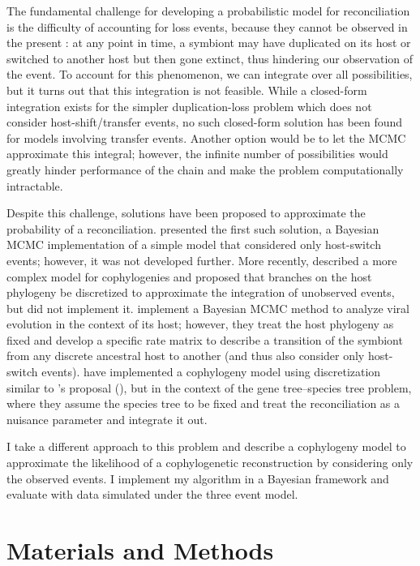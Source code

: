 \documentclass[12pt,letterpaper]{article}
\newcommand{\aposcite}[2]{\citeauthor{#1}'s #2 (\citeyear{#1})}
\begin{document}
The fundamental challenge for developing a probabilistic model for reconciliation is the difficulty of accounting for loss events, because they cannot be observed in the present \parencite{Charleston:2009}: at any point in time, a symbiont may have duplicated on its host or switched to another host but then gone extinct, thus hindering our observation of the event. To account for this phenomenon, we can integrate over all possibilities, but it turns out that this integration is not feasible. While a closed-form integration exists for the simpler duplication-loss problem \parencite{Gernhard:2008} which does not consider host-shift/transfer events, no such closed-form solution has been found for models involving transfer events. Another option would be to let the \ac{MCMC} approximate this integral; however, the infinite number of possibilities would greatly hinder performance of the chain and make the problem computationally intractable.

Despite this challenge, solutions have been proposed to approximate the probability of a reconciliation. \textcite{Huelsenbeck:2000} presented the first such solution, a Bayesian \ac{MCMC} implementation of a simple model that considered only host-switch events; however, it was not developed further. More recently, \textcite{Charleston:2009} described a more complex model for cophylogenies and proposed that branches on the host phylogeny be discretized to approximate the integration of unobserved events, but did not implement it. \textcite{Faria:2013} implement a Bayesian \ac{MCMC} method to analyze viral evolution in the context of its host; however, they treat the host phylogeny as fixed and develop a specific rate matrix to describe a transition of the symbiont from any discrete ancestral host to another (and thus also consider only host-switch events). \textcite{Sjostrand:2013} have implemented a cophylogeny model using discretization similar to \aposcite{Charleston:2009}{proposal}, but in the context of the gene tree--species tree problem, where they assume the species tree to be fixed and treat the reconciliation as a nuisance parameter and integrate it out.

I take a different approach to this problem and describe a cophylogeny model to approximate the likelihood of a cophylogenetic reconstruction by considering only the observed events. I implement my algorithm in a Bayesian framework and evaluate with data simulated under the three event model.

\section*{Materials and Methods}
\end{document}
